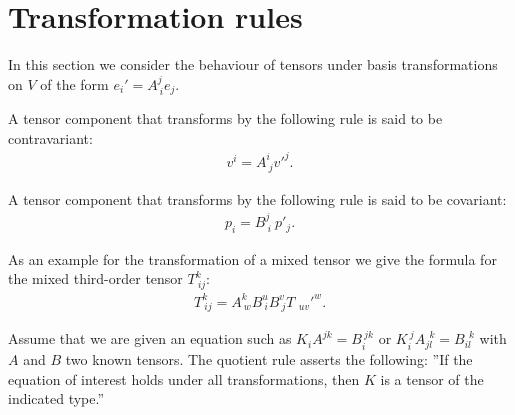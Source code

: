 
\section{Transformation rules}

    In this section we consider the behaviour of tensors under basis transformations on $V$ of the form $e_i' = A^j_{\ i}e_j$.

    \begin{definition}[Contravariant]\label{tensorcalculus:contravariant}
        A tensor component that transforms by the following rule is said to be contravariant:
        \begin{gather}
            v^i = A^i_{\ j}v'^j.
        \end{gather}
    \end{definition}

    \begin{definition}[Covariant]\label{tensorcalculus:covariant}
        A tensor component that transforms by the following rule is said to be covariant:
        \begin{gather}
            p_i = B^j_{\ i}\ p'_j.
        \end{gather}
    \end{definition}

    \begin{example}
        As an example for the transformation of a mixed tensor we give the formula for the mixed third-order tensor $T_{\ ij}^k$:
        \begin{gather}
            T_{\ ij}^k = A^k_{\ w}B^u_{\ i}B^v_{\ j}T_{\ \ uv}'^w.
        \end{gather}
    \end{example}

    \begin{method}
        Assume that we are given an equation such as $K_iA^{jk} = B_i^{\ jk}$ or $K_i^{\ j}A_{jl}^{\ \ k} = B_{il}^{\ \ k}$ with $A$ and $B$ two known tensors\footnotemark. The quotient rule asserts the following: ''If the equation of interest holds under all transformations, then $K$ is a tensor of the indicated type.''
    \end{method}

